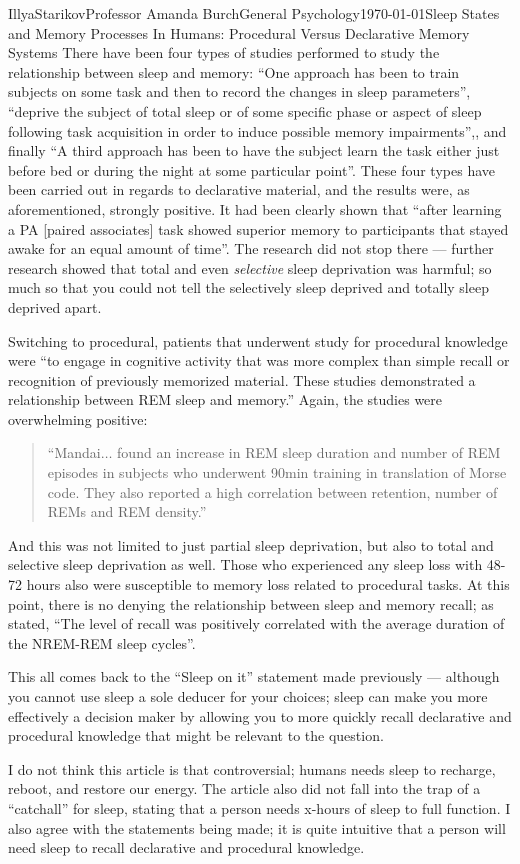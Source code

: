 \documentclass[12pt,letterpaper]{article}
\begin{document}
\begin{mla}{Illya}{Starikov}{Professor Amanda Burch}{General Psychology}{\today}{Sleep States and Memory Processes In Humans: Procedural Versus Declarative Memory Systems}
There have been four types of studies performed to study the relationship between sleep and memory: ``One approach has been to train subjects on some task and then to record the changes in sleep parameters'', ``deprive the subject of total sleep or of some specific phase or aspect of sleep following task acquisition in order to induce possible memory impairments'',, and finally ``A third approach has been to have the subject learn the task either just before bed or during the night at some particular point''. These four types have been carried out in regards to declarative material, and the results were, as aforementioned, strongly positive. It had been clearly shown that ``after learning a PA [paired associates] task showed superior memory to participants that stayed awake for an equal amount of time''. The research did not stop there --- further research showed that total and even \textit{selective} sleep deprivation was harmful; so much so that you could not tell the selectively sleep deprived and totally sleep deprived apart.

Switching to procedural, patients that underwent study for procedural knowledge were ``to engage in cognitive activity that was more complex than simple recall or recognition of previously memorized material. These studies demonstrated a relationship between REM sleep and memory.'' Again, the studies were overwhelming positive:

\begin{quotation}
\noindent ``Mandai$\ldots$ found an increase in REM sleep duration and number of REM episodes in subjects who underwent 90min training in translation of Morse code. They also reported a high correlation between retention, number of REMs and REM density.''
\end{quotation}

\noindent And this was not limited to just partial sleep deprivation, but also to total and selective sleep deprivation as well. Those who experienced any sleep loss with 48-72 hours also were susceptible to memory loss related to procedural tasks. At this point, there is no denying the relationship between sleep and memory recall; as stated, ``The level of recall was positively correlated with the average duration of the NREM-REM sleep cycles''.

This all comes back to the ``Sleep on it'' statement made previously --- although you cannot use sleep a sole deducer for your choices; sleep can make you more effectively a decision maker by allowing you to more quickly recall declarative and procedural knowledge that might be relevant to the question.

I do not think this article is that controversial; humans needs sleep to recharge, reboot, and restore our energy. The article also did not fall into the trap of a ``catchall'' for sleep, stating that a person needs x-hours of sleep to full function. I also agree with the statements being made; it is quite intuitive that a person will need sleep to recall declarative and procedural knowledge.


\end{mla}
\end{document}
